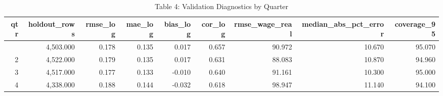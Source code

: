 \begin{table}[t]
\caption*{
{\fontsize{20}{25}\selectfont  Table 4: Validation Diagnostics by Quarter\fontsize{12}{15}\selectfont }
} 
\fontsize{12.0pt}{14.0pt}\selectfont
\begin{tabular*}{\linewidth}{@{\extracolsep{\fill}}rrrrrrrrr}
\toprule
qtr & holdout\_rows & rmse\_log & mae\_log & bias\_log & cor\_log & rmse\_wage\_real & median\_abs\_pct\_error & coverage\_95 \\ 
\midrule\addlinespace[2.5pt]
1 & 4,503.000 & 0.178 & 0.135 & 0.017 & 0.657 & 90.972 & 10.670 & 95.070 \\ 
2 & 4,522.000 & 0.179 & 0.135 & 0.017 & 0.631 & 88.083 & 10.870 & 94.960 \\ 
3 & 4,517.000 & 0.177 & 0.133 & -0.010 & 0.640 & 91.161 & 10.300 & 95.000 \\ 
4 & 4,338.000 & 0.188 & 0.144 & -0.032 & 0.618 & 98.947 & 11.140 & 94.100 \\ 
\bottomrule
\end{tabular*}
\end{table}


